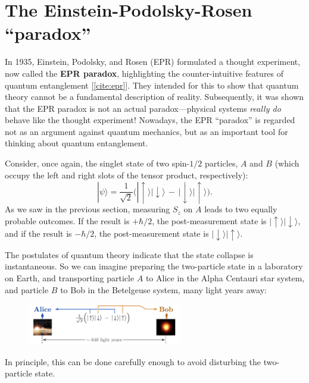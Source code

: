 \documentclass[pra,12pt]{revtex4-2}
\begin{document}
\section{The Einstein-Podolsky-Rosen ``paradox''}

In 1935, Einstein, Podolsky, and Rosen (EPR) formulated a thought
experiment, now called the \textbf{EPR paradox}, highlighting the
counter-intuitive features of quantum entanglement [\ref{cite:epr}].
They intended for this to show that quantum theory cannot be a
fundamental description of reality.  Subsequently, it was shown that
the EPR paradox is not an actual paradox---physical systems
\textit{really do} behave like the thought experiment!  Nowadays, the
EPR ``paradox'' is regarded not as an argument against quantum
mechanics, but as an important tool for thinking about quantum
entanglement.

Consider, once again, the singlet state of two spin-$1/2$ particles,
$A$ and $B$ (which occupy the left and right slots of the tensor
product, respectively):
\begin{equation}
  |\psi\rangle = \frac{1}{\sqrt{2}} \Big(|\!\uparrow\rangle|\!\downarrow\rangle \,-\, |\!\downarrow\rangle|\!\uparrow\rangle\Big).
  \label{eprsinglet}
\end{equation}
As we saw in the previous section, measuring $S_z$ on $A$ leads to two
equally probable outcomes.  If the result is $+\hbar/2$, the
post-measurement state is $|\!\uparrow\rangle |\!\downarrow\rangle$,
and if the result is $-\hbar/2$, the post-measurement state is
$|\!\downarrow\rangle|\!\uparrow\rangle$.

The postulates of quantum theory indicate that the state collapse is
instantaneous.  So we can imagine preparing the two-particle state in
a laboratory on Earth, and transporting particle $A$ to Alice in the
Alpha Centauri star system, and particle $B$ to Bob in the Betelgeuse
system, many light years away:

\begin{figure}[h]
  \centering\includegraphics[width=0.6\textwidth]{epr}
\end{figure}

\noindent
In principle, this can be done carefully enough to avoid disturbing
the two-particle state.
\end{document}
